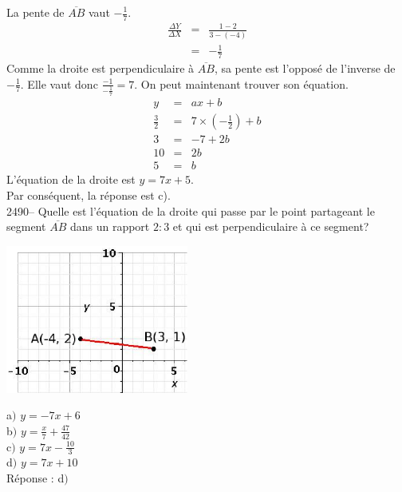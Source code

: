 \documentclass[letterpaper, 12pt]{article}
\begin{document}
La pente de $\overline{AB}$ vaut $-\frac{1}{7}$.
\begin{eqnarray*}
 \frac{\Delta Y}{\Delta X}&=&\frac{1-2}{3-(-4)}\\[2mm]
&=&-\frac{1}{7}
\end{eqnarray*}
Comme la droite est perpendiculaire \`a $\overline{AB}$, sa pente est l'oppos\'e de l'inverse de $-\frac{1}{7}$. Elle vaut donc $\frac{-1}{-\frac{1}{7}}=7$. On peut maintenant trouver son \'equation.
\begin{eqnarray*}
 y&=&ax+b\\
 \frac{3}{2}&=&7\times \left( -\frac{1}{2}\right) +b\\[2mm]
 3&=&-7+2b\\[2mm]
 10&=&2b\\[2mm]
 5&=&b
\end{eqnarray*}
L'\'equation de la droite est $y=7x+5$.\\
Par cons\'equent, la r\'eponse est c).\\

2490-- Quelle est l'\'equation de la droite qui passe par le point partageant le segment $\overline{AB}$ dans un rapport $2:3$ et qui est perpendiculaire \`a ce segment?\\
\begin{center}
 \includegraphics[width=6cm,bb=14 14 329 231]{Q2489.eps}
\end{center}

a$)$ $y=-7x+6$\\
b$)$ $y=\frac{x}{7}+\frac{47}{42}$\\
c$)$ $y=7x-\frac{10}{3}$\\
d$)$ $y=7x+10$\\

R\'eponse : d$)$\\
\end{document}
